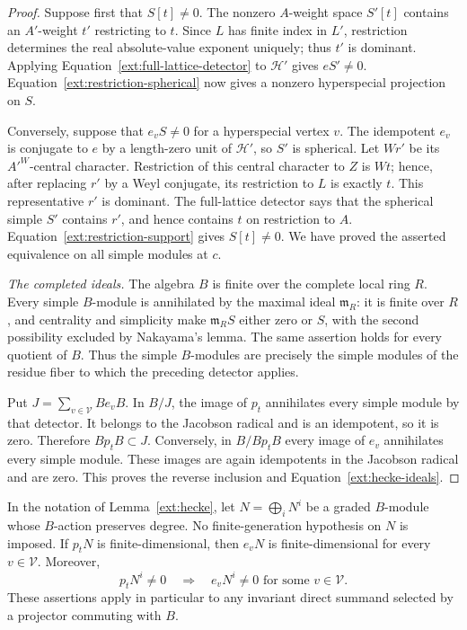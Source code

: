 \begin{proof}
  Suppose first that $S[t]\ne0$.  The nonzero $A$-weight space $S'[t]$
  contains an $A'$-weight $t'$ restricting to $t$.  Since $L$ has finite
  index in $L'$, restriction determines the real absolute-value exponent
  uniquely; thus $t'$ is dominant.  Applying
  Equation~\eqref{ext:full-lattice-detector} to $\mathcal H'$ gives
  $eS'\ne0$.  Equation~\eqref{ext:restriction-spherical} now gives a
  nonzero hyperspecial projection on $S$.

  Conversely, suppose that $e_vS\ne0$ for a hyperspecial vertex $v$.
  The idempotent $e_v$ is conjugate to $e$ by a length-zero unit of
  $\mathcal H'$, so $S'$ is spherical.  Let $Wr'$ be its $A'^W$-central
  character.  Restriction of this central character to $Z$ is $Wt$;
  hence, after replacing $r'$ by a Weyl conjugate, its restriction to
  $L$ is exactly $t$.  This representative $r'$ is dominant.  The
  full-lattice detector says that the spherical simple $S'$ contains
  $r'$, and hence contains $t$ on restriction to $A$.
  Equation~\eqref{ext:restriction-support} gives $S[t]\ne0$.  We have
  proved the asserted equivalence on all simple modules at $c$.

  \smallskip
  \noindent\emph{The completed ideals.}
  The algebra $B$ is finite over the complete local ring $R$.
  Every simple $B$-module is annihilated by the maximal ideal
  $\mathfrak m_R$: it is finite over $R$, and centrality and simplicity
  make $\mathfrak m_R S$ either zero or $S$, with the second possibility
  excluded by Nakayama's lemma.  The same assertion holds for every
  quotient of $B$.  Thus the simple $B$-modules are precisely the simple
  modules of the residue fiber to which the preceding detector applies.

  Put $J=\sum_{v\in\mathcal V}Be_vB$.  In $B/J$, the image of $p_t$
  annihilates every simple module by that detector.  It belongs to the
  Jacobson radical and is an idempotent, so it is zero.  Therefore
  $Bp_tB\subset J$.  Conversely, in $B/Bp_tB$ every image of $e_v$
  annihilates every simple module.  These images are again idempotents
  in the Jacobson radical and are zero.  This proves the reverse
  inclusion and Equation~\eqref{ext:hecke-ideals}.
\end{proof}

\begin{corollary}\label{ext:hecke-finite}
  In the notation of Lemma~\ref{ext:hecke}, let
  $N=\bigoplus_i N^i$ be a graded $B$-module whose $B$-action preserves
  degree.  No finite-generation hypothesis on $N$ is imposed.
  If $p_tN$ is finite-dimensional, then $e_vN$ is finite-dimensional for
  every $v\in\mathcal V$.  Moreover,
  \[
    p_tN^i\ne0\quad\Longrightarrow\quad
    e_vN^i\ne0\text{ for some }v\in\mathcal V.
  \]
  These assertions apply in particular to any invariant direct summand
  selected by a projector commuting with $B$.
\end{corollary}

